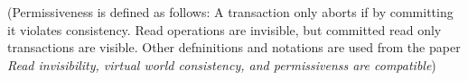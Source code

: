 \documentclass[11pt]{article}
\begin{document}
\newenvironment{theorem-repeat}[1]{\begin{trivlist}
\item[\hspace{\labelsep}{\bf\noindent Theorem~\ref{#1} }]}%
{\end{trivlist}}

\newenvironment{corollary-repeat}[1]{\begin{trivlist}
\item[\hspace{\labelsep}{\bf\noindent Corollary~\ref{#1} }]}%
{\end{trivlist}}

(Permissiveness is defined as follows: A transaction only aborts if by committing it violates consistency.
Read operations are invisible, but committed read only transactions are visible.
Other defninitions and notations are used from the paper \emph{Read invisibility, virtual world consistency, and permissivenss are compatible})
\end{document}
